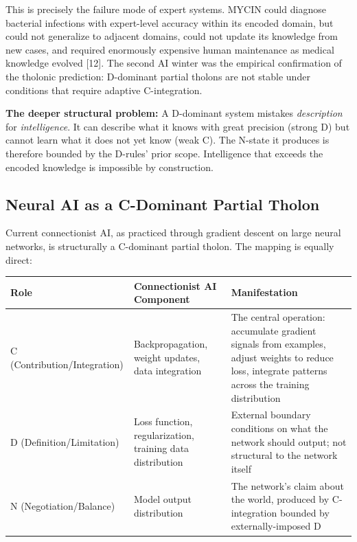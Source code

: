 \documentclass[12pt]{article}
\begin{document}
This is precisely the failure mode of expert systems. MYCIN could
diagnose bacterial infections with expert-level accuracy within its
encoded domain, but could not generalize to adjacent domains, could not
update its knowledge from new cases, and required enormously expensive
human maintenance as medical knowledge evolved {[}12{]}. The second AI
winter was the empirical confirmation of the tholonic prediction:
D-dominant partial tholons are not stable under conditions that require
adaptive C-integration.

\textbf{The deeper structural problem:} A D-dominant system mistakes
\emph{description} for \emph{intelligence}. It can describe what it
knows with great precision (strong D) but cannot learn what it does not
yet know (weak C). The N-state it produces is therefore bounded by the
D-rules' prior scope. Intelligence that exceeds the encoded knowledge is
impossible by construction.

\subsection{Neural AI as a C-Dominant Partial Tholon}\label{neural-ai-as-a-c-dominant-partial-tholon}

Current connectionist AI, as practiced through gradient descent on large
neural networks, is structurally a C-dominant partial tholon. The
mapping is equally direct:

\begin{longtable}[]{@{}
  >{\raggedright\arraybackslash}p{}
  >{\raggedright\arraybackslash}p{}
  >{\raggedright\arraybackslash}p{}@{}}
\toprule\noalign{}
\begin{minipage}[b]{\linewidth}\raggedright
Role
\end{minipage} & \begin{minipage}[b]{\linewidth}\raggedright
Connectionist AI Component
\end{minipage} & \begin{minipage}[b]{\linewidth}\raggedright
Manifestation
\end{minipage} \\
\midrule\noalign{}
\endhead
\bottomrule\noalign{}
\endlastfoot
C (Contribution/Integration) & Backpropagation, weight updates, data
integration & The central operation: accumulate gradient signals from
examples, adjust weights to reduce loss, integrate patterns across the
training distribution \\
D (Definition/Limitation) & Loss function, regularization, training data
distribution & External boundary conditions on what the network should
output; not structural to the network itself \\
N (Negotiation/Balance) & Model output distribution & The network's
claim about the world, produced by C-integration bounded by
externally-imposed D \\
\end{longtable}
\end{document}
